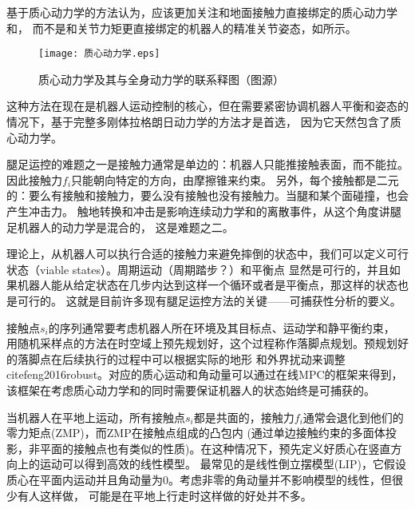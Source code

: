 基于质心动力学的方法认为，应该更加关注和地面接触力直接绑定的质心动力学
和，
而不是和关节力矩更直接绑定的机器人的精准关节姿态\cite{vukobratovic1972contribution}，如所示。
\begin{figure}[htbp]
    \centering
    \texttt{[image: 质心动力学.eps]}
    \caption{\label{fig:centroid}质心动力学及其与全身动力学的联系释图（图源\cite{carpentier2016center}）}
\end{figure}
这种方法在现在是机器人运动控制的核心，但在需要紧密协调机器人平衡和姿态的情况下，基于完整多刚体拉格朗日动力学的方法才是首选，
因为它天然包含了质心动力学\cite{orin2013centroidal}。

腿足运控的难题之一是接触力通常是单边的：机器人只能推接触表面，而不能拉。因此接触力$f_i$只能朝向特定的方向，由摩擦锥来约束。
另外，每个接触都是二元的：要么有接触和接触力，要么没有接触也没有接触力。当腿和某个面碰撞，也会产生冲击力。
触地转换和冲击是影响连续动力学和的离散事件，从这个角度讲腿足机器人的动力学是混合的，
这是难题之二。

理论上，从机器人可以执行合适的接触力来避免摔倒的状态中，我们可以定义可行状态（viable states）。周期运动（周期踏步？）和平衡点
显然是可行的，并且如果机器人能从给定状态在几步内达到这样一个循环或者是平衡点，那这样的状态也是可行的\cite{wieber2002stability}。
这就是目前许多现有腿足运控方法的关键\cite{wieber2016modeling}——可捕获性分析\cite{pratt2006velocity}的要义。

接触点$s_i$的序列通常要考虑机器人所在环境及其目标点、运动学和静平衡约束\cite{escande2013planning}，
用随机采样点的方法在时空域上预先规划好，这个过程称作落脚点规划。预规划好的落脚点在后续执行的过程中可以根据实际的地形
和外界扰动来调整cite{feng2016robust}。对应的质心运动和角动量可以通过在线MPC的框架来得到\cite{wieber2006trajectory}，
该框架在考虑质心动力学和的同时需要保证机器人的状态始终是可捕获的\cite{wieber2016modeling}。

当机器人在平地上运动，所有接触点$s_i$都是共面的，接触力$f_i$通常会退化到他们的零力矩点(ZMP)，而ZMP在接触点组成的凸包内\cite{wieber2002stability}
(通过单边接触约束的多面体投影，非平面的接触点也有类似的性质\cite{caron2016zmp})。在这种情况下，预先定义好质心在竖直方向上的运动可以得到高效的线性模型。
最常见的是线性倒立摆模型(LIP)，它假设质心在平面内运动并且角动量为0\cite{kajita1991study}。考虑非零的角动量并不影响模型的线性，但很少有人这样做，
可能是在平地上行走时这样做的好处并不多\cite{koolen2012capturability}。

